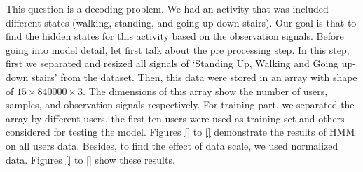 This question is a decoding problem. We had an activity that was included different states (walking, standing, and going up-down stairs). Our goal is that to find the hidden states for this activity based on the observation signals.
Before going into model detail, let first talk about the pre processing step. In this step, first we separated and resized all signals of ‘Standing  Up,  Walking  and  Going  up-down  stairs’ from the dataset. Then, this data were stored in an array with shape of $15 \times 840000 \times 3$. The dimensions of this array show the number of users,  samples, and observation signals respectively.
For training part, we separated the array by different users. the first ten users were used as training set and others considered for testing the model. Figures \ref{} to \ref{} demonstrate the results of HMM on all users data. Besides, to find the effect of data scale, we used normalized data. Figures \ref{} to \ref{} show these results.











